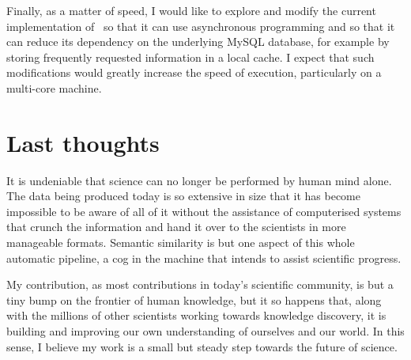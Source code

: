 Finally, as a matter of speed, I would like to explore and modify the current implementation of \mossy\ so that it can use asynchronous programming and so that it can reduce its dependency on the underlying MySQL database, for example by storing frequently requested information in a local cache. I expect that such modifications would greatly increase the speed of execution, particularly on a multi-core machine.


\section{Last thoughts} \label{sec:conclusions/thoughts}

It is undeniable that science can no longer be performed by human mind alone. The data being produced today is so extensive in size that it has become impossible to be aware of all of it without the assistance of computerised systems that crunch the information and hand it over to the scientists in more manageable formats. Semantic similarity is but one aspect of this whole automatic pipeline, a cog in the machine that intends to assist scientific progress.

My contribution, as most contributions in today's scientific community, is but a tiny bump on the frontier of human knowledge, but it so happens that, along with the millions of other scientists working towards knowledge discovery, it is building and improving our own understanding of ourselves and our world. In this sense, I believe my work is a small but steady step towards the future of science.
